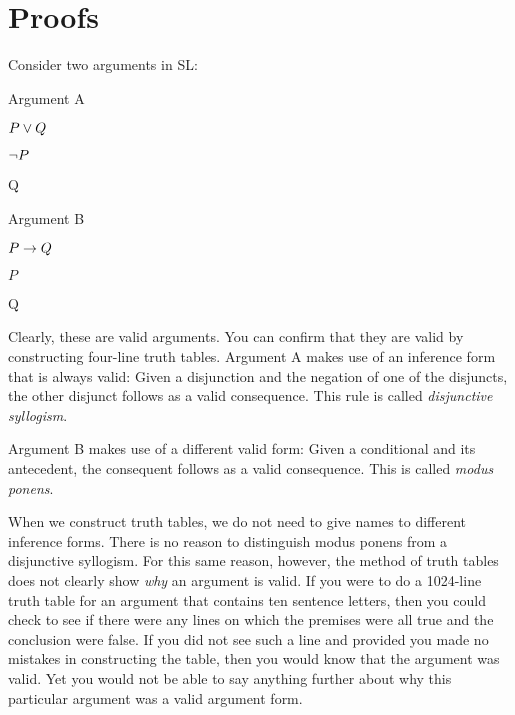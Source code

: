 \chapter{Proofs}
\label{ch.proofs}

Consider two arguments in SL:

\begin{multicols}{2}
Argument A
\begin{earg}
\item[] $P \vee Q$
\item[] $\neg P$
\item[\therefore] Q
\end{earg}

Argument B
\begin{earg}
\item[] $P \rightarrow Q$
\item[] $P$
\item[\therefore] Q
\end{earg}

\end{multicols}

Clearly, these are valid arguments. You can confirm that they are valid by constructing four-line truth tables. Argument A makes use of an inference form that is always valid: Given a disjunction and the negation of one of the disjuncts, the other disjunct follows as a valid consequence. This rule is called \emph{disjunctive syllogism}.

Argument B makes use of a different valid form: Given a conditional and its antecedent, the consequent follows as a valid consequence. This is called \emph{modus ponens}.

 When we construct truth tables, we do not need to give names to different inference forms. There is no reason to distinguish modus ponens from a disjunctive syllogism. For this same reason, however, the method of truth tables does not clearly show \emph{why} an argument is valid. If you were to do a 1024-line truth table for an argument that contains ten sentence letters, then you could check to see if there were any lines on which the premises were all true and the conclusion were false. If you did not see such a line and provided you made no mistakes in constructing the table, then you would know that the argument was valid. Yet you would not be able to say anything further about why this particular argument was a valid argument form.

